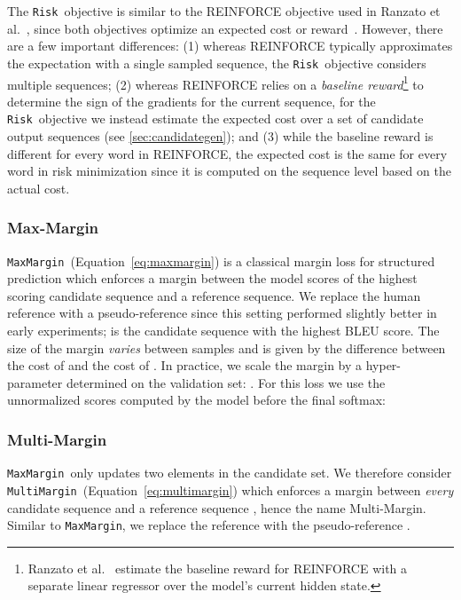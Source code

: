 \documentclass[11pt,a4paper]{article}
\newcommand{\Risk}{\texttt{Risk}}
\newcommand{\MaxMargin}{\texttt{MaxMargin}}
\newcommand{\MultiMargin}{\texttt{MultiMargin}}
\begin{document}
The \Risk~objective is similar to the REINFORCE objective used in Ranzato et al.~, since both objectives optimize an expected cost or reward~\citep{williams1992reinforce}.
However, there are a few important differences:
(1) whereas REINFORCE typically approximates the expectation with a single sampled sequence, the \Risk~objective considers multiple sequences;
(2) whereas REINFORCE relies on a {\it baseline reward}\footnote{Ranzato et al.~ estimate the baseline reward for REINFORCE with a separate linear regressor over the model's current hidden state.} to determine the sign of the gradients for the current sequence, for the \Risk~objective we instead estimate the expected cost over a set of candidate output sequences (see \textsection\ref{sec:candidategen});
and (3) while the baseline reward is different for every word in REINFORCE, the expected cost is the same for every word in risk minimization since it is computed on the sequence level based on the actual cost.

\subsubsection*{Max-Margin}
\label{sec:maxmargin}

\MaxMargin~(Equation~\ref{eq:maxmargin}) is a classical margin loss for structured prediction \citep{mmmn, structure_pred} which enforces a margin between the model scores of the highest scoring candidate sequence  and a reference sequence.
We replace the human reference  with a pseudo-reference  since this setting performed slightly better in early experiments;  is the candidate sequence with the highest BLEU score.
The size of the margin \emph{varies} between samples and is given by the difference between the cost of  and the cost of .
In practice, we scale the margin by a hyper-parameter  determined on the validation set: .
For this loss we use the unnormalized scores computed by the model before the final softmax:



\subsubsection*{Multi-Margin}
\label{sec:multimargin}

\MaxMargin~only updates two elements in the candidate set.
We therefore consider \MultiMargin~(Equation~\ref{eq:multimargin}) which enforces a margin between \emph{every} candidate sequence  and a reference sequence \citep{herbrich199icann}, hence the name Multi-Margin.
Similar to \MaxMargin, we replace the reference  with the pseudo-reference .
\end{document}
